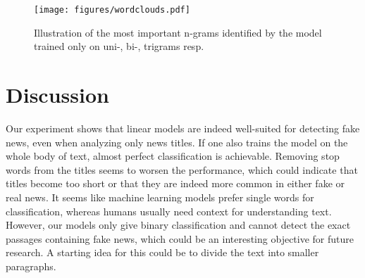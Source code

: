 \documentclass[10pt]{article}
\begin{document}
	\begin{figure}[h!]
		\centering
		\texttt{[image: figures/wordclouds.pdf]}
		\caption{Illustration of the most important n-grams identified by the model trained only on uni-, bi-, trigrams resp.}
		\label{Fig 3}
	\end{figure}
	

	
	
	\section{Discussion}
	Our experiment shows that linear models are indeed well-suited for detecting fake news, even when analyzing only news titles. If one also trains the model on the whole body of text, almost perfect classification is achievable. Removing stop words from the titles seems to worsen the performance, which could indicate that titles become too short or that they are indeed more common in either fake or real news. It seems like machine learning models prefer single words for classification, whereas humans usually need context for understanding text. However, our models only give binary classification and cannot detect the exact passages containing fake news, which could be an interesting objective for future research. A starting idea for this could be to divide the text into smaller paragraphs. 
	
	
\end{document}
